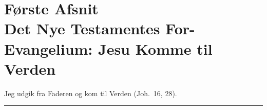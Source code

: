 \documentclass[12pt,a4paper]{book}
\begin{document}
\chapter*{Første Afsnit\\[4pt]
  \large Det Nye Testamentes For-Evangelium: Jesu Komme til Verden}
\label{ch:afsnit1}

\begin{center}
  {\footnotesize Jeg udgik fra Faderen og kom til Verden (Joh.\ 16, 28).}\\[10pt]
  \rule{0.22\textwidth}{0.4pt}
\end{center}
\end{document}
